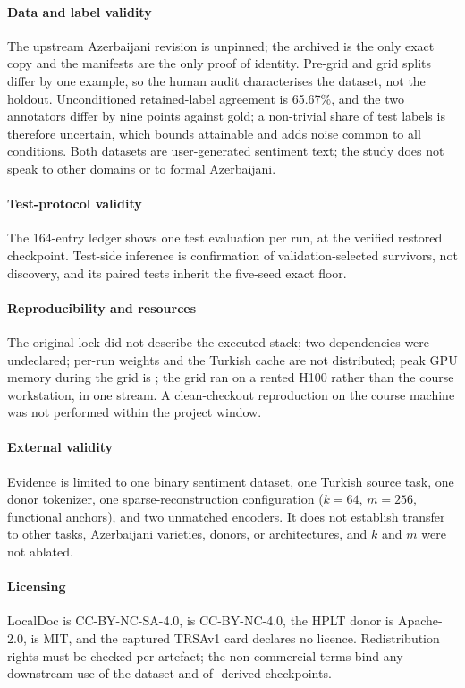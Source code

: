 \paragraph{Data and label validity} The upstream Azerbaijani revision is unpinned; the archived  is the only exact copy and the manifests are the only proof of identity. Pre-grid and grid splits differ by one example, so the human audit characterises the dataset, not the holdout. Unconditioned retained-label agreement is 65.67\%, and the two annotators differ by nine points against gold; a non-trivial share of test labels is therefore uncertain, which bounds attainable \Fone{} and adds noise common to all conditions. Both datasets are user-generated sentiment text; the study does not speak to other domains or to formal Azerbaijani.

\paragraph{Test-protocol validity} The 164-entry ledger shows one test evaluation per run, at the verified restored checkpoint. Test-side inference is confirmation of validation-selected survivors, not discovery, and its paired tests inherit the five-seed exact floor.

\paragraph{Reproducibility and resources} The original lock did not describe the executed stack; two dependencies were undeclared; per-run weights and the Turkish cache are not distributed; peak GPU memory during the grid is \NM; the grid ran on a rented H100 rather than the course workstation, in one stream. A clean-checkout reproduction on the course machine was not performed within the project window.

\paragraph{External validity} Evidence is limited to one binary sentiment dataset, one Turkish source task, one donor tokenizer, one sparse-reconstruction configuration ($k=64$, $m=256$, functional anchors), and two unmatched encoders. It does not establish transfer to other tasks, Azerbaijani varieties, donors, or architectures, and $k$ and $m$ were not ablated.

\paragraph{Licensing} LocalDoc is CC-BY-NC-SA-4.0, \xlmxv{} is CC-BY-NC-4.0, the HPLT donor is Apache-2.0, \xlmr{} is MIT, and the captured TRSAv1 card declares no licence. Redistribution rights must be checked per artefact; the non-commercial terms bind any downstream use of the dataset and of \xlmxv{}-derived checkpoints.
